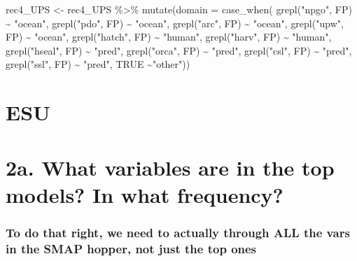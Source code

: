 \documentclass[
]{article}
\newenvironment{Shaded}{\begin{snugshade}}{\end{snugshade}}
\newcommand{\AttributeTok}[1]{\textcolor[rgb]{0.77,0.63,0.00}{#1}}
\newcommand{\ConstantTok}[1]{\textcolor[rgb]{0.00,0.00,0.00}{#1}}
\newcommand{\FunctionTok}[1]{\textcolor[rgb]{0.00,0.00,0.00}{#1}}
\newcommand{\NormalTok}[1]{#1}
\newcommand{\OtherTok}[1]{\textcolor[rgb]{0.56,0.35,0.01}{#1}}
\newcommand{\SpecialCharTok}[1]{\textcolor[rgb]{0.00,0.00,0.00}{#1}}
\newcommand{\StringTok}[1]{\textcolor[rgb]{0.31,0.60,0.02}{#1}}
\begin{document}
\begin{Shaded}
\begin{Highlighting}[]
\NormalTok{rec4\_UPS }\OtherTok{\textless{}{-}}\NormalTok{  rec4\_UPS }\SpecialCharTok{\%\textgreater{}\%} 
  \FunctionTok{mutate}\NormalTok{(}\AttributeTok{domain =} \FunctionTok{case\_when}\NormalTok{(}
    \FunctionTok{grepl}\NormalTok{(}\StringTok{"npgo"}\NormalTok{, FP) }\SpecialCharTok{\textasciitilde{}} \StringTok{"ocean"}\NormalTok{,}
    \FunctionTok{grepl}\NormalTok{(}\StringTok{"pdo"}\NormalTok{, FP) }\SpecialCharTok{\textasciitilde{}} \StringTok{"ocean"}\NormalTok{,}
    \FunctionTok{grepl}\NormalTok{(}\StringTok{"arc"}\NormalTok{, FP) }\SpecialCharTok{\textasciitilde{}} \StringTok{"ocean"}\NormalTok{,}
    \FunctionTok{grepl}\NormalTok{(}\StringTok{"upw"}\NormalTok{, FP) }\SpecialCharTok{\textasciitilde{}} \StringTok{"ocean"}\NormalTok{, }
    \FunctionTok{grepl}\NormalTok{(}\StringTok{"hatch"}\NormalTok{, FP) }\SpecialCharTok{\textasciitilde{}} \StringTok{"human"}\NormalTok{,}
    \FunctionTok{grepl}\NormalTok{(}\StringTok{"harv"}\NormalTok{, FP) }\SpecialCharTok{\textasciitilde{}} \StringTok{"human"}\NormalTok{,}
    \FunctionTok{grepl}\NormalTok{(}\StringTok{"hseal"}\NormalTok{, FP) }\SpecialCharTok{\textasciitilde{}} \StringTok{"pred"}\NormalTok{,}
    \FunctionTok{grepl}\NormalTok{(}\StringTok{"orca"}\NormalTok{, FP) }\SpecialCharTok{\textasciitilde{}} \StringTok{"pred"}\NormalTok{,}
    \FunctionTok{grepl}\NormalTok{(}\StringTok{"csl"}\NormalTok{, FP) }\SpecialCharTok{\textasciitilde{}} \StringTok{"pred"}\NormalTok{, }
    \FunctionTok{grepl}\NormalTok{(}\StringTok{"ssl"}\NormalTok{, FP) }\SpecialCharTok{\textasciitilde{}} \StringTok{"pred"}\NormalTok{, }
    \ConstantTok{TRUE} \SpecialCharTok{\textasciitilde{}}\StringTok{"other"}\NormalTok{))}
\end{Highlighting}
\end{Shaded}

\hypertarget{esu}{%
\section{ESU}\label{esu}}

\hypertarget{a.-what-variables-are-in-the-top-models-in-what-frequency}{%
\section{2a. What variables are in the top models? In what
frequency?}\label{a.-what-variables-are-in-the-top-models-in-what-frequency}}

\hypertarget{to-do-that-right-we-need-to-actually-through-all-the-vars-in-the-smap-hopper-not-just-the-top-ones}{%
\subsubsection{To do that right, we need to actually through ALL the
vars in the SMAP hopper, not just the top
ones}\label{to-do-that-right-we-need-to-actually-through-all-the-vars-in-the-smap-hopper-not-just-the-top-ones}}
\end{document}
